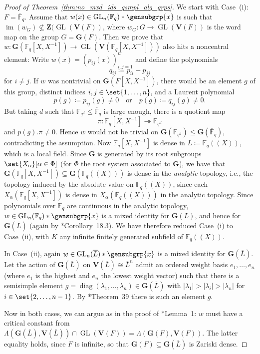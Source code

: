 \documentclass[a4paper,12pt]{amsproc}
\newcommand{\norm}[1]{\left\lvert#1\right\rvert}%
\DeclareMathOperator{\GL}{GL}%
\DeclareMathOperator{\diag}{diag}
\DeclareMathOperator{\im}{im}
\theoremstyle{plain}
\theoremstyle{definition}
\begin{document}
\begin{proof}[Proof of Theorem~\ref{thm:no_mxd_ids_qsmpl_alg_grps}]
We start with Case~(i): $F=\overline{\mathbb{F}}_q$. Assume that $w(x)\in\GL_n(\mathbb{F}_q)\ast\gensubgrp{x}$ is such that $\im(w_G)\nsubseteq\mathbf{Z}(\GL(\mathbf{V}(F))$, where $w_G\colon G\to\GL(\mathbf{V}(F))$ is the word map on the group $G=\mathbf{G}(F)$. Then we prove that $w\colon\mathbf{G}(\mathbb{F}_q[X,X^{-1}])\to\GL(\mathbf{V}(\mathbb{F}_q[X,X^{-1}]))$ also hits a noncentral element: Write $w(x)=(p_{ij}(x))_{i,j=1}^n$ and define the polynomials $$q_{ij}\coloneqq p_{ii}-p_{jj}$$ for $i\neq j$. If $w$ was nontrivial on $\mathbf{G}(F[X,X^{-1}])$, there would be an element $g$ of this group, distinct indices $i,j\in\set{1,\ldots,n}$, and a Laurent polynomial 
$$p(g)\coloneqq p_{ij}(g)\neq 0 \quad\text{or}\quad p(g)\coloneqq q_{ij}(g)\neq 0.$$ 
But taking $d$ such that $\mathbb{F}_{q^d}\leq\overline{\mathbb{F}}_q$ is large enough, there is a quotient map $$\pi\colon\mathbb{F}_q[X,X^{-1}]\twoheadrightarrow\mathbb{F}_{q^d}$$ and $p(g).\pi\neq 0$.
Hence $w$ would not be trivial on $\mathbf{G}(\mathbb{F}_{q^d})\leq\mathbf{G}(\overline{\mathbb{F}}_q)$, contradicting the assumption.
Now $\mathbb{F}_q[X,X^{-1}]$ is dense in $L\coloneqq\mathbb{F}_q(\!(X)\!)$, which is a local field. Since $\mathbf{G}$ is generated by its root subgroups 
$\set{X_{\alpha}}[\alpha \in \Phi]$ 
(for $\Phi$ the root system associated to $\mathbf{G}$), 
we have that $\mathbf{G}(\mathbb{F}_q[X,X^{-1}])\subseteq\mathbf{G}(\mathbb{F}_q(\!(X)\!))$ is dense in the \emph{analytic} topology, i.e., the topology induced by the absolute value on $\mathbb{F}_q(\!(X)\!)$, since each $X_{\alpha} (\mathbb{F}_q[X,X^{-1}])$ 
is dense in $X_{\alpha}(\mathbb{F}_q(\!(X)\!))$ in the analytic topology. 
Since polynomials over $\mathbb{F}_q$ are continuous in the analytic topology,  $w\in\GL_n(\mathbb{F}_q)\ast\gensubgrp{x}$ is a mixed identity for $\mathbf{G}(L)$, 
and hence for $\mathbf{G}(\overline{L})$ 
(again by \cite{borel2012linear}*{Corollary~18.3}). 
We have therefore reduced Case~(i) to Case~(ii), 
with $K$ any infinite finitely generated subfield of $\mathbb{F}_q(\!(X)\!)$.

In Case~(ii), again $w\in\GL_n(\overline{L})\ast\gensubgrp{x}$ is a mixed identity for $\mathbf{G}(\overline{L})$. 
Let the action of $\mathbf{G}(\overline{L})$ on $\mathbf{V}(\overline{L})\cong \overline{L}^n$ admit an ordered weight basis $e_1,\ldots,e_n$ (where $e_1$ is the highest and $e_n$ the lowest weight vector) such that there is a semisimple element $g=\diag(\lambda_1,\ldots,\lambda_n)\in\mathbf{G}(\overline{L})$ with $\norm{\lambda_1}>\norm{\lambda_i}>\norm{\lambda_n}$ for $i\in\set{2,\ldots,n-1}$. By \cite{steinbergfaulknerwilson1967lectures}*{Theorem~39} there is such an element $g$.

Now in both cases, we can argue as in the proof of \cite{tomanov1985generalized}*{Lemma~1}: $w$ must have a critical constant from $\Lambda(\mathbf{G}(\overline{L}),\mathbf{V}(\overline{L}))\cap\GL(\mathbf{V}(F))=\Lambda(\mathbf{G}(F),\mathbf{V}(F))$. The latter equality holds, since $F$ is infinite, so that $\mathbf{G}(F)\subseteq\mathbf{G}(\overline{L})$ is Zariski dense.
\end{proof}
\end{document}
